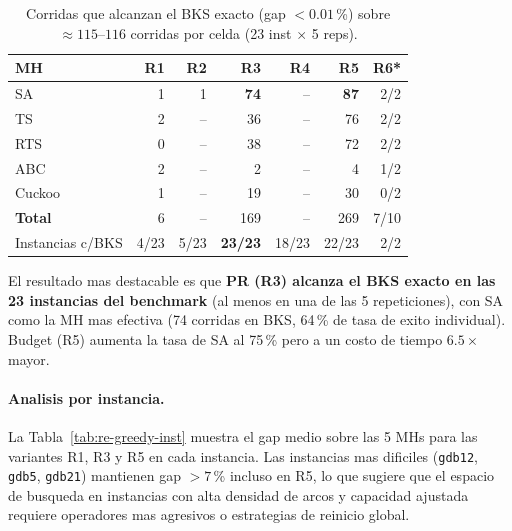 \begin{table}[h]
\centering
\caption{Corridas que alcanzan el BKS exacto (gap $< 0.01$\,\%) sobre
         $\approx 115$--$116$ corridas por celda (23 inst $\times$ 5 reps).}
\label{tab:re-greedy-bks}
\small
\begin{tabular}{lrrrrrr}
\toprule
MH & R1 & R2 & R3 & R4 & R5 & R6* \\
\midrule
SA      &  1 &  1 & \textbf{74} &  -- & \textbf{87} & 2/2 \\
TS      &  2 &  -- & 36         &  -- & 76          & 2/2 \\
RTS     &  0 &  -- & 38         &  -- & 72          & 2/2 \\
ABC     &  2 &  -- &  2         &  -- &  4          & 1/2 \\
Cuckoo  &  1 &  -- & 19         &  -- & 30          & 0/2 \\
\midrule
\textbf{Total} & 6 & -- & 169 & -- & 269 & 7/10 \\
\midrule
Instancias c/BKS & 4/23 & 5/23 & \textbf{23/23} & 18/23 & 22/23 & 2/2 \\
\bottomrule
\end{tabular}
\end{table}

El resultado mas destacable es que \textbf{PR (R3) alcanza el BKS exacto
en las 23 instancias del benchmark} (al menos en una de las 5
repeticiones), con SA como la MH mas efectiva (74 corridas en BKS,
64\,\% de tasa de exito individual). Budget (R5) aumenta la tasa de
SA al 75\,\% pero a un costo de tiempo $6.5\times$ mayor.

\paragraph{Analisis por instancia.}
La Tabla~\ref{tab:re-greedy-inst} muestra el gap medio sobre las 5 MHs
para las variantes R1, R3 y R5 en cada instancia. Las instancias mas
dificiles (\texttt{gdb12}, \texttt{gdb5}, \texttt{gdb21}) mantienen
gap $> 7$\,\% incluso en R5, lo que sugiere que el espacio de busqueda
en instancias con alta densidad de arcos y capacidad ajustada requiere
operadores mas agresivos o estrategias de reinicio global.

